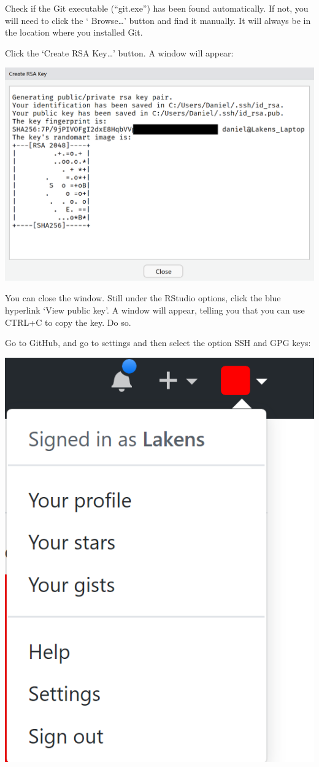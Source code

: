 \documentclass[
  oneside]{krantz}
\begin{document}
Check if the Git executable (``git.exe'') has been found automatically. If not,
you will need to click the ` Browse\ldots' button and find it manually. It will
always be in the location where you installed Git.

Click the `Create RSA Key\ldots{}' button. A window will appear:

\begin{center}\includegraphics[width=1\linewidth]{images/afd9d82e34e9fbff7e9d83c9b89e29c0} \end{center}

You can close the window. Still under the RStudio options, click the blue
hyperlink `View public key'. A window will appear, telling you that you can use
CTRL+C to copy the key. Do so.

Go to GitHub, and go to settings and then select the option SSH and GPG keys:

\begin{center}\includegraphics[width=0.5\linewidth]{images/e2c7d8cad7b8127e20ad6caf6d2b84ea} \end{center}
\end{document}
